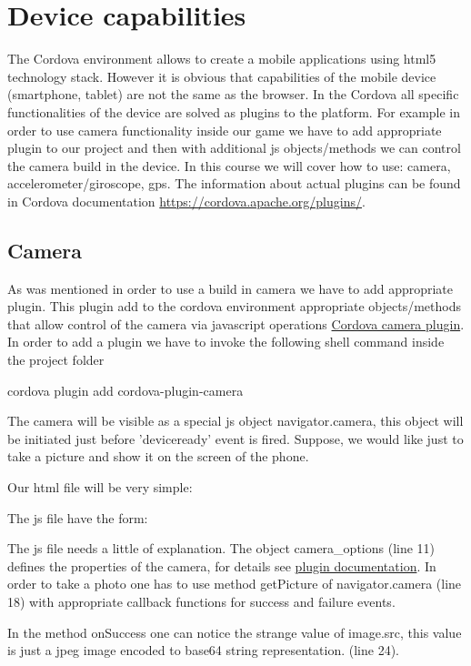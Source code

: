 \chapter{Device capabilities}

The Cordova environment allows to create a mobile applications using html5 technology stack. However it is obvious that capabilities of the mobile device (smartphone, tablet) are not the same as the browser. In the Cordova all specific functionalities of the device are solved as plugins to the platform. For example in order to use camera functionality inside our game we have to add appropriate plugin to our project and then with additional js objects/methods we can control the camera build in the device. In this course we will cover how to use: camera, accelerometer/giroscope, gps. The information about actual plugins can be found in Cordova documentation \url{https://cordova.apache.org/plugins/}.

\section{Camera}
As was mentioned in order to use a build in camera we have to add appropriate plugin. This plugin add to the cordova environment appropriate objects/methods that allow control of the camera via javascript operations \href{https://cordova.apache.org/docs/en/latest/reference/cordova-plugin-camera/index.html}{Cordova camera plugin}. In order to add a plugin we have to invoke the following shell command inside the project folder

\begin{shell}
cordova plugin add cordova-plugin-camera
\end{shell}

The camera will be visible as a special js object navigator.camera, this object will be initiated just before 'deviceready' event is fired. Suppose, we would like just to take a picture and show it on the screen of the phone.

Our html file will be very simple:


The js file have the form:


\begin{explain}
  The js file needs a little of explanation.
  The object camera\_options (line 11) defines the properties of the camera, for details see  \href{https://cordova.apache.org/docs/en/latest/reference/cordova-plugin-camera/index.html#cameracameraoptions--object}{plugin documentation}. In order to take a photo one has to use method getPicture of navigator.camera (line 18) with appropriate callback functions for success and failure events.

  In the method onSuccess one can notice the strange value of image.src, this value is just a jpeg image encoded to base64 string representation. (line 24).

\end{explain}
